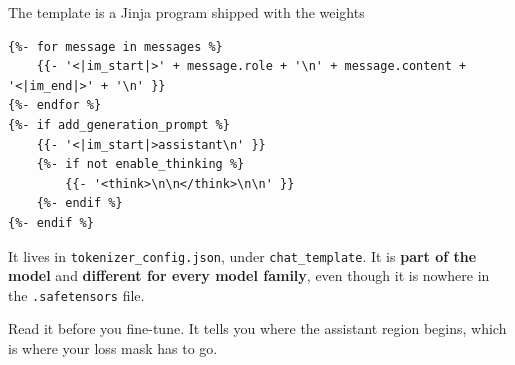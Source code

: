 \documentclass[aspectratio=169,10pt]{beamer}
\begin{document}
\begin{frame}[fragile]{The template is a Jinja program shipped with the weights}
\begin{lstlisting}[language=jinja]
{%- for message in messages %}
    {{- '<|im_start|>' + message.role + '\n' + message.content + '<|im_end|>' + '\n' }}
{%- endfor %}
{%- if add_generation_prompt %}
    {{- '<|im_start|>assistant\n' }}
    {%- if not enable_thinking %}
        {{- '<think>\n\n</think>\n\n' }}
    {%- endif %}
{%- endif %}
\end{lstlisting}
  \vspace{0.3em}
  \small
  It lives in \texttt{tokenizer\_config.json}, under \texttt{chat\_template}.
  It is \textbf{part of the model} and \textbf{different for every model
  family}, even though it is nowhere in the \texttt{.safetensors} file.
  \vspace{0.2em}

  Read it before you fine-tune. It tells you where the assistant region
  begins, which is where your loss mask has to go.
\end{frame}
\end{document}
